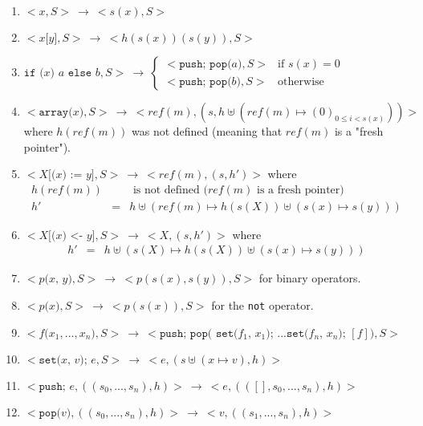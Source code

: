 \documentclass[12pt,a4paper]{article}
\newcommand{\cl}[1]{\texttt{#1}}
\begin{document}
\begin{enumerate}
\itemsep-0.2em
\item $<x,S> \ \longrightarrow \ < s(x), S> $
\item $<x \cl{[} y \cl{]} , S> \ \longrightarrow \ < h( s(x) )( s(y) ) , S >$
\item $
\cl{if (} x \cl{) } a \cl{ else } b, S>  \ \longrightarrow \ 
\left\lbrace \begin{array}{ll}
< \cl{push; pop(}a\cl{)} , S> & \text{if } s(x) = 0 \\
< \cl{push; pop(}b\cl{)} , S> & \text{otherwise}
\end{array} \right. $
\item $<\cl{array(} x \cl{)} , S > \ \longrightarrow \ < ref(m), (s , h \uplus (ref(m) \mapsto (0)_{0 \leq i < s(x)}) ) >$\\

where $h(ref(m))$ was not defined (meaning that $ref(m)$ is a "fresh pointer").
\item $< X \cl{[(} x \cl{) := } y \cl{]} , S> \ \longrightarrow \ < ref(m), (s, h') >$ where
\begin{eqnarray*}
h(ref(m)) & & \text{ is not defined  \ \ \ \ ($ref(m)$ is a fresh pointer)} \\
h' &=& h \uplus \left( ref(m) \mapsto h( s(X) ) \uplus \left( s(x) \mapsto s(y) \right) \right)
\end{eqnarray*}
\item $< X \cl{[(} x \cl{) <- } y \cl{]} , S> \ \longrightarrow \ < X, (s, h') >$ where
\begin{eqnarray*}
h' &=& h \uplus \left( s(X) \mapsto h( s(X) ) \uplus \left( s(x) \mapsto s(y) \right) \right)
\end{eqnarray*}
\item $< p\cl{(} x \cl{, } y \cl{)}, S> \ \longrightarrow \ < p( s(x) , s(y) ), S>$ for binary operators.
\item $< p\cl{(} x \cl{)}, S> \ \longrightarrow \ < p( s(x) ), S >$ for the \cl{not} operator.
\item $<f\cl{(} x_1, ... , x_n \cl{)} , S> \ \longrightarrow \ < \cl{push; pop( set(}f_1 \cl{, } x_1\cl{); } ... \cl{set(}f_n \cl{, } x_n \cl{); } [f] \cl{)}, S> $
\item $<\cl{set(} x \cl{, } v \cl{); } e, S> \ \longrightarrow \ < e, (s \uplus (x \mapsto v), h)> $
\item $<\cl{push; } e, ( (s_0, ... , s_n), h) >  \ \longrightarrow \ < e, ( ([], s_0, ... , s_n), h) >  $
\item $<\cl{pop(} v \cl{)}, ( (s_0, ... , s_n), h) > \ \longrightarrow \ <v, ( (s_1, ... , s_n), h) > $
\end{enumerate}
\end{document}

